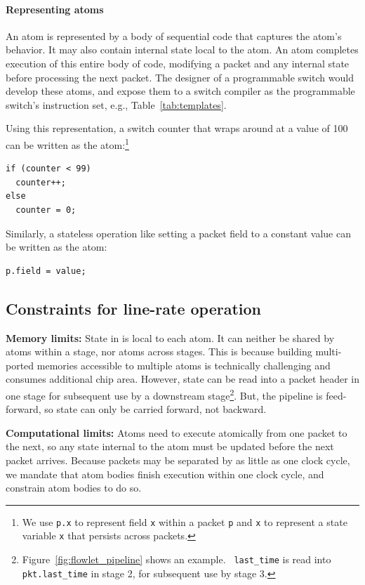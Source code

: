 \paragraph{Representing atoms}
An atom is represented by a body of sequential code that captures the atom's
behavior. It may also contain internal state local to the atom. An atom
completes execution of this entire body of code, modifying a packet and any
internal state before processing the next packet. The designer of a
programmable switch would develop these atoms, and expose them to a switch
compiler as the programmable switch's instruction set, e.g.,
Table~\ref{tab:templates}.

Using this representation, a switch counter that wraps around at a
value of 100 can be written as the atom:\footnote{We use {\tt p.x} to
  represent field {\tt x} within a packet {\tt p} and {\tt x} to
  represent a state variable {\tt x} that persists across packets.}
\begin{lstlisting}[style=customc, numbers=none, frame=none]
if (counter < 99)
  counter++;
else
  counter = 0;
\end{lstlisting}

Similarly, a stateless operation like setting a packet field to a constant
value can be written as the atom:
\begin{lstlisting}[style=customc, numbers=none, frame=none]
  p.field = value;
\end{lstlisting}

\subsection{Constraints for line-rate operation}
\label{s:atomConstraints}

\textbf{Memory limits: } State in \absmachine is local to each atom.  It can
neither be shared by atoms within a stage, nor atoms across stages. This is
because building multi-ported memories accessible to multiple atoms is
technically challenging and consumes additional chip area. However, state can
be read into a packet header in one stage for subsequent use by a downstream
stage\footnote{Figure~\ref{fig:flowlet_pipeline} shows an example. {\tt
last\_time} is read into {\tt pkt.last\_time} in stage 2, for subsequent use by stage 3.}.  But, the \absmachine pipeline is
feed-forward, so state can only be carried forward, not backward.

\textbf{Computational limits:} Atoms need to execute atomically from one packet
to the next, so any state internal to the atom must be updated
before the next packet arrives.  Because packets may be separated by as little
as one clock cycle, we mandate that atom bodies finish execution within one
clock cycle, and constrain atom bodies to do so.

